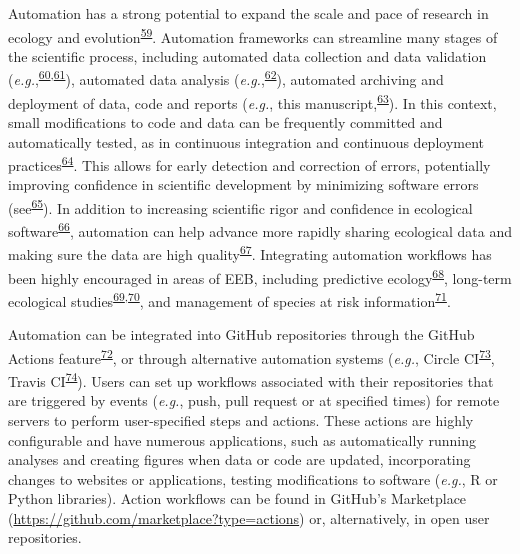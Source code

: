 Automation has a strong potential to expand the scale and pace of research in ecology and evolution\textsuperscript{\protect\hyperlink{ref-cfgXxgt1}{59}}.
Automation frameworks can streamline many stages of the scientific process, including automated data collection and data validation (\emph{e.g.},\textsuperscript{\protect\hyperlink{ref-bhDgD6lF}{60},\protect\hyperlink{ref-lXvpQxeN}{61}}), automated data analysis (\emph{e.g.},\textsuperscript{\protect\hyperlink{ref-Qh7xTLwz}{62}}), automated archiving and deployment of data, code and reports (\emph{e.g.}, this manuscript,\textsuperscript{\protect\hyperlink{ref-SirQKFIz}{63}}).
In this context, small modifications to code and data can be frequently committed and automatically tested, as in continuous integration and continuous deployment practices\textsuperscript{\protect\hyperlink{ref-1Ep9EJL6y}{64}}.
This allows for early detection and correction of errors, potentially improving confidence in scientific development by minimizing software errors (see\textsuperscript{\protect\hyperlink{ref-ufw0ZdnI}{65}}).
In addition to increasing scientific rigor and confidence in ecological software\textsuperscript{\protect\hyperlink{ref-12103x16N}{66}}, automation can help advance more rapidly sharing ecological data and making sure the data are high quality\textsuperscript{\protect\hyperlink{ref-rTbinQMj}{67}}.
Integrating automation workflows has been highly encouraged in areas of EEB, including predictive ecology\textsuperscript{\protect\hyperlink{ref-mmCOSRfr}{68}}, long-term ecological studies\textsuperscript{\protect\hyperlink{ref-1CJo8lo2v}{69},\protect\hyperlink{ref-RxK4CmfR}{70}}, and management of species at risk information\textsuperscript{\protect\hyperlink{ref-kZzfmBNu}{71}}.

Automation can be integrated into GitHub repositories through the GitHub Actions feature\textsuperscript{\protect\hyperlink{ref-NUXbp429}{72}}, or through alternative automation systems (\emph{e.g.}, Circle CI\textsuperscript{\protect\hyperlink{ref-T03Api6e}{73}}, Travis CI\textsuperscript{\protect\hyperlink{ref-YeFSbfFV}{74}}).
Users can set up workflows associated with their repositories that are triggered by events (\emph{e.g.}, push, pull request or at specified times) for remote servers to perform user-specified steps and actions.
These actions are highly configurable and have numerous applications, such as automatically running analyses and creating figures when data or code are updated, incorporating changes to websites or applications, testing modifications to software (\emph{e.g.}, R or Python libraries).
Action workflows can be found in GitHub's Marketplace (\url{https://github.com/marketplace?type=actions}) or, alternatively, in open user repositories.

